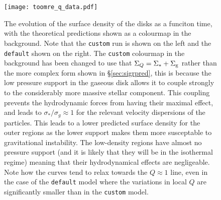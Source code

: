 \begin{figure}
    \centering
    \texttt{[image: toomre\_q\_data.pdf]}
    \caption{The evolution of the surface density of the disks as a funciton time, with the theoretical predictions shown as a colourmap in the background. Note that the {\tt custom} run is shown on the left and the {\tt default} shown on the right. The {\tt custom} colourmap in the background has been changed to use that $\Sigma_Q = \Sigma_* + \Sigma_\mathrm{g}$ rather than the more complex form shown in \S \ref{sec:sigrpred}, this is because the low pressure support in the gaseous disk allows it to couple strongly to the considerably more massive stellar component. This coupling prevents the hydrodynamic forces from having their maximal effect, and leads to $\sigma_*/\sigma_g \approx 1$ for the relevant velocity dispersions of the particles. This leads to a lower predicted surface density for the outer regions as the lower support makes them more susceptable to gravitational instability. The low-density regions have almost no pressure support (and it is likely that they will be in the isothermal regime) meaning that their hydrodynamical effects are negligeable. Note how the curves tend to relax towards the $Q\approx1$ line, even in the case of the {\tt default} model where the variations in local $Q$ are significantly smaller than in the {\tt custom} model.}
    \label{fig:toomreqthr_dat}
\end{figure}

